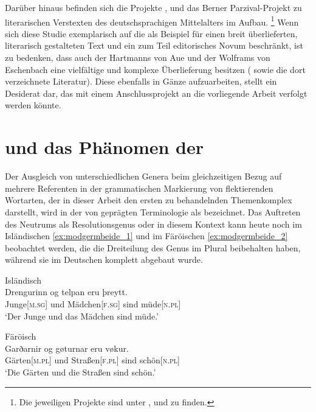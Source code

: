 Darüber hinaus befinden sich die Projekte 
\autocite{iwdigital},  \autocite{ldmdigital} und das
Berner Parzival-Projekt \autocite{parzivalprojekt} zu literarischen Verstexten
des deutschsprachigen Mittelalters im Aufbau.%
%
	\footnote{Die jeweiligen Projekte sind unter ,
	 und  zu finden.}
%
Wenn sich diese Studie exemplarisch auf die \KC{} als Beispiel für einen breit
überlieferten, literarisch gestalteten Text und ein zum Teil editorisches Novum
beschränkt, ist zu bedenken, dass auch der  Hartmanns von
Aue und der  Wolframs von
Eschenbach eine vielfältige und komplexe
Überlieferung besitzen (\cite[vgl.][s.\,v.~\textit{:
}, \textit{: }]{hsc} sowie
die dort verzeichnete Literatur). Diese ebenfalls in Gänze aufzuarbeiten,
stellt ein Desiderat dar, das mit einem Anschlussprojekt an die vorliegende
Arbeit verfolgt werden könnte.

\section{ und das Phänomen der }
\label{sec:einlgendres}

Der Ausgleich von unterschiedlichen Genera beim gleichzeitigen Bezug auf
mehrere Referenten in der grammatischen Markierung von flektierenden Wortarten,
der in dieser Arbeit den ersten zu behandelnden Themenkomplex darstellt, wird
in der von \citet{corbett1983} geprägten Terminologie als  bezeichnet. Das Auftreten des Neutrums als Resolutionsgenus oder
 \autocites{corbett1999}{wechsler2009} in diesem Kontext kann heute
noch im Isländischen \cref{ex:modgermbeide_1} und im Färöischen
\cref{ex:modgermbeide_2} beobachtet werden, die die Dreiteilung des Genus im
Plural beibehalten haben, während sie im Deutschen komplett abgebaut wurde.

\begin{exe}
\ex \label{ex:modgermbeide}
\begin{xlist}
\ex \label{ex:modgermbeide_1}
	\langinfo%
		{Isländisch}%
		{}%
		{\cites[nach][283]{corbett1991}[569]{wechsler2009}}\\
	\gll Drengurinn og telpan eru þreytt. \\
		Junge[\textsc{m.sg}] und Mädchen[\textsc{f.sg}] sind
		müde[\textsc{n.pl}] \\
	\trans `Der Junge und das Mädchen sind müde.'

\ex \label{ex:modgermbeide_2}
	\langinfo%
		{Färöisch}%
		{}%
		{\cite[nach][225]{thrainsson2004}}\\
	\gll Garðarnir og gøturnar eru vøkur. \\
		Gärten[\textsc{m.pl}] und Straßen[\textsc{f.pl}] sind
		schön[\textsc{n.pl}] \\
	\trans `Die Gärten und die Straßen sind schön.'
\end{xlist}
\end{exe}

